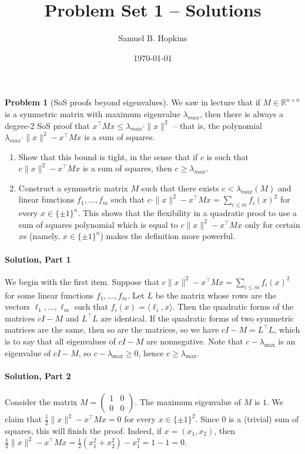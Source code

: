 \documentclass[11pt]{article}
\title{Problem Set 1 -- Solutions}
\author{Samuel B. Hopkins}
\date{\today}
\theoremstyle{definition}
\newtheorem{problem}[theorem]{Problem}
\newcommand{\iprod}[1]{\langle #1 \rangle}
\begin{document}
\maketitle


\begin{problem}[SoS proofs beyond eigenvalues]
We saw in lecture that if $M \in \mathbb{R}^{n \times n}$ is a symmetric matrix with maximum eigenvalue $\lambda_{max}$, then there is always a degree-2 SoS proof that $x^\top M x \leq \lambda_{max} \cdot \|x\|^2$ -- that is, the polynomial $\lambda_{max} \cdot \|x\|^2 - x^\top M x$ is a sum of squares.

\begin{enumerate}
\item Show that this bound is tight, in the sense that if $c$ is such that $c \|x\|^2 - x^\top M x$ is a sum of squares, then $c \geq \lambda_{max}$.

\item Construct a symmetric matrix $M$ such that there exists $c < \lambda_{max}(M)$ and linear functions $f_1,\ldots,f_m$ such that $c \cdot \|x\|^2 - x^\top M x = \sum_{i \leq m} f_i(x)^2$ for every $x \in \{ \pm 1\}^n$. This shows that the flexibility in a quadratic proof to use a sum of squares polynomial which is equal to $c \|x\|^2 - x^\top M x$ only for certain $x$s (namely, $x \in \{\pm 1\}^n$) makes the definition more powerful.
\end{enumerate}
\end{problem}

\paragraph{Solution, Part 1}
We begin with the first item.
Suppose that $c \|x\|^2 - x^\top M x = \sum_{i \leq m} f_i(x)^2$ for some linear functions $f_1,\ldots,f_m$.
Let $L$ be the matrix whose rows are the vectors $\ell_1,\ldots,\ell_m$ such that $f_i(x) = \iprod{\ell_i,x}$.
Then the quadratic forms of the matrices $c I - M$ and $L^\top L$ are identical.
If the quadratic forms of two symmetric matrices are the same, then so are the matrices, so we have $c I - M = L^\top L$, which is to say that all eigenvalues of $c I - M$ are nonnegative.
Note that $c - \lambda_{\max}$ is an eigenvalue of $c I - M$, so $c - \lambda_{\max} \geq 0$, hence $c \geq \lambda_{\max}$.

\paragraph{Solution, Part 2}
Consider the matrix $M = \left ( \begin{matrix} 1 & 0 \\ 0 & 0 \end{matrix} \right )$.
The maximum eigenvalue of $M$ is $1$.
We claim that $\frac 12 \|x\|^2 - x^\top M x = 0$ for every $x \in \{ \pm 1\}^2$.
Since $0$ is a (trivial) sum of squares, this will finish the proof.
Indeed, if $x = (x_1,x_2)$, then $\frac 12 \|x\|^2 - x^\top M x = \frac 12 (x_1^2 + x_2^2) - x_1^2 = 1 - 1 = 0$.
\end{document}
